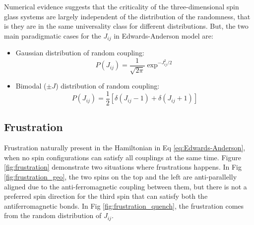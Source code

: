 Numerical evidence suggests that the criticality of the three-dimensional
spin glass systems are largely independent of the distribution of the randomness,
that is they are in the same universality class for different distributions. 
But, the two main paradigmatic cases for the $J_{ij}$ in Edwards-Anderson model are:
\begin{itemize}
\item Gaussian distribution of random coupling:
  \begin{equation}
    \label{eq:Jij_Gaussian}
    P(J_{ij})=\frac{1}{\sqrt{2\pi}}\exp^{-J_{ij}^2/2}
  \end{equation}
\item Bimodal ($\pm J$) distribution of random coupling:
  \begin{equation}
    \label{eq:Jij_bimodal}
    P(J_{ij})=\frac{1}{2}[\delta(J_{ij}-1)+\delta(J_{ij}+1)]
  \end{equation}
\end{itemize}

\subsection{Frustration}
\label{sec:frustration}
Frustration naturally present in the Hamiltonian in Eq \ref{eq:Edwards-Anderson}, when no spin 
configurations can satisfy all couplings at the same time. 
Figure \ref{fig:frustration} demonstrate two situations where frustrations 
happens. In Fig \ref{fig:frustration_geo}, the two spins on the top and the left
are anti-parallelly aligned due to the anti-ferromagnetic coupling between them,
but there is not a preferred spin direction for the third spin that can satisfy
both the antiferromagnetic bonds. In Fig \ref{fig:frustration_quench}, the 
frustration comes from the random distribution of $J_{ij}$. 

